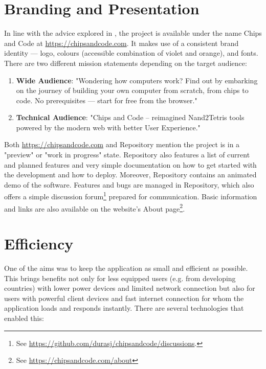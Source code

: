 \section{Branding and Presentation}

In line with the advice explored in , the project is available under the name Chips and Code at \href{chipsandcode.com}{https://chipsandcode.com}.
It makes use of a consistent brand identity --- logo, colours (accessible combination of violet and orange), and fonts.
There are two different mission statements depending on the target audience:

\begin{enumerate}
    \item \textbf{Wide Audience}: "Wondering how computers work? Find out by embarking on the journey of building your own computer from scratch, from chips to code. No prerequisites --- start for free from the browser."
    \item \textbf{Technical Audience}: "Chips and Code – reimagined Nand2Tetris tools powered by the modern web with better User Experience."
\end{enumerate}

Both \href{chipsandcode.com}{https://chipsandcode.com} and Repository mention the project is in a "preview" or "work in progress" state.
Repository also features a list of current and planned features and very simple documentation on how to get started with the development and how to deploy.
Moreover, Repository contains an animated demo of the software.
Features and bugs are managed in Repository, which also offers a simple discussion forum\footnote{See \url{https://github.com/durasj/chipsandcode/discussions}.} prepared for communication.
Basic information and links are also available on the website's About page\footnote{See \url{https://chipsandcode.com/about}}.

\section{Efficiency}

One of the aims was to keep the application as small and efficient as possible.
This brings benefits not only for less equipped users (e.g. from developing countries) with lower power devices and limited network connection but also for users with powerful client devices and fast internet connection for whom the application loads and responds instantly.
There are several technologies that enabled this:

